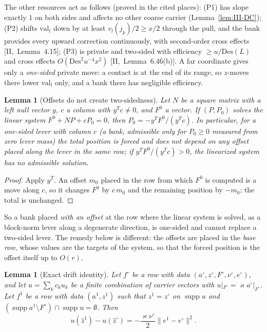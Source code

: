\documentclass[10pt]{amsart}
\newtheorem{lemma}[theorem]{Lemma}
\theoremstyle{definition}
\theoremstyle{remark}
\newcommand{\supp}{\operatorname{supp}}
\newcommand{\zh}{\hat z}
\begin{document}
The other resources act as follows (proved in the cited places): (P1) has
slope exactly $1$ on both sides and affects no other coarse carrier
(Lemma~\ref{lem:III-DC}); (P2) shifts $\mathrm{val}_l$ down by at
least $v_l(j_p)/2\ge x/2$ through the pull, and the bank provides every upward
correction continuously, with second-order cross effects [II,~Lemma~4.15];
(P3) is private and two-sided with efficiency $\ge u/\mathrm{Des}(L)$ and cross
effects $O(\mathrm{Des}^2u^{-4}x^2)$ [II,~Lemma~6.46(b)].  A far coordinate
gives only a \emph{one-sided} private move: a contact is at the end of its range,
so $z$-moves there lower $\mathrm{val}_l$ only, and a bank there has
negligible efficiency.

\begin{lemma}[Offsets do not create two-sidedness]\label{lem:III-offset}
Let $N$ be a square matrix with a left null vector $y$, $c$ a column with
$y^Tc\ne0$, and $F^0$ a vector.  If $(P,P_0)$ solves the linear system
$F^0+NP+cP_0=0$, then $P_0=-y^TF^0/(y^Tc)$.  In particular, for a one-sided
lever with column $c$ \textup{(}a bank, admissible only for $P_0\ge0$ measured
from zero lever mass\textup{)} the total position is forced and does not
depend on any offset placed along the lever in the same row; if
$y^TF^0/(y^Tc)>0$, the linearized system has no admissible solution.
\end{lemma}

\begin{proof}
Apply $y^T$.  An offset $m_0$ placed in the row from which $F^0$ is computed
is a move along $c$, so it changes $F^0$ by $c\,m_0$ and the remaining
position by $-m_0$; the total is unchanged.
\end{proof}

So a bank placed \emph{with an offset} at the row where the linear system is
solved, as a block-norm lever along a degenerate direction, is one-sided and
cannot replace a two-sided lever.  The remedy below is different: the offsets
are placed in the \emph{base row}, whose values are the targets of the system,
so that the forced position is the offset itself up to $O(r)$.

\begin{lemma}[Exact drift identity]\label{lem:III-driftid}
Let $f^\circ$ be a row with data $(a^\circ,z^\circ,F^\circ,\nu^\circ,e^\circ)$, and
let $u=\sum_kc_ku_k$ be a finite combination of carrier vectors with
$u|_{F^\circ}=\varkappa a^\circ|_{F^\circ}$.  Let $f^1$ be a row with data
$(a^1,z^1)$ such that $z^1=z^\circ$ on $\supp u$ and
$(\supp a^1\setminus F^\circ)\cap\supp u=\emptyset$.  Then
\[
 u(\zh^1)-u(\zh^\circ)=-\frac{\varkappa\nu^\circ}2\|e^1-e^\circ\|^2 .
\]
\end{lemma}
\end{document}
